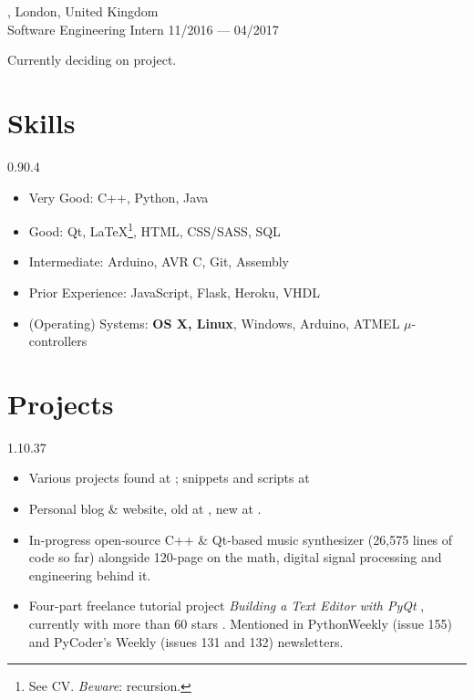 \begin{entry}
	{, London, United Kingdom}
	{\\Software Engineering Intern}
	{11/2016 --- 04/2017}
	\item Currently deciding on project.
\end{entry}

\section{Skills}{0.9}{0.4}
\vspace{-2mm}
\begin{multicols}{2}
	\begin{itemize}
		\item Very Good: C++, Python, Java
		\item Good: Qt, \LaTeX\footnote{See CV. \emph{Beware}: recursion.}, HTML,
      CSS/SASS, SQL
		\item Intermediate: Arduino, AVR C, Git, Assembly
		\item Prior Experience: JavaScript, Flask, Heroku, VHDL
		\item (Operating) Systems: \textbf{OS X, Linux}, Windows, Arduino, ATMEL $\mu$-controllers
	\end{itemize}
\end{multicols}

\section{Projects}{1.1}{0.37}
\vspace{-5mm}
\begin{itemize}
	\item Various projects found at
	; snippets and scripts at 
	\item Personal blog \& website, old at , new at .
	\item In-progress open-source C++ \& Qt-based music synthesizer
     (26,575
    lines of code so far) alongside 120-page  on the math, digital signal processing and
    engineering behind it.
	\item Four-part freelance tutorial project \emph{Building a Text Editor with
      PyQt} , currently with
    more than 60 stars . Mentioned in PythonWeekly (issue 155) and PyCoder's Weekly (issues 131 and 132) newsletters.
\end{itemize}

